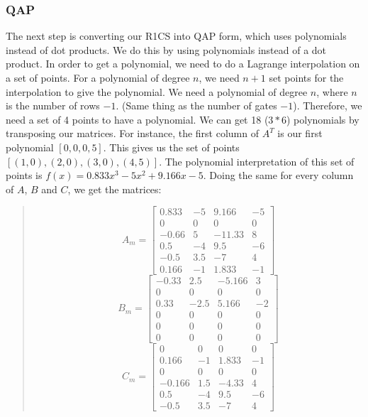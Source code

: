 \subsubsection{QAP}
The next step is converting our R1CS into QAP form, which uses polynomials instead of dot products.
We do this by using polynomials instead of a dot product.
In order to get a polynomial, we need to do a Lagrange interpolation on a set of points.
For a polynomial of degree $n$, we need $n+1$ set points for the interpolation to give the polynomial.
We need a polynomial of degree $n$, where $n$ is the number of rows $- 1$. (Same thing as the number of gates $-1$). 
Therefore, we need a set of 4 points to have a polynomial.
We can get 18 ($3*6$) polynomials by transposing our matrices.
For instance, the first column of $A^T$ is our first polynomial $[0,0,0,5]$.
This gives us the set of points $[(1,0),(2,0),(3,0),(4,5)]$.
The polynomial interpretation of this set of points is $f(x) = 0.833x^3 - 5x^2 + 9.166x -5$.
Doing the same for every column of $A$, $B$ and $C$, we get the matrices:
\begin{quote}
   \[
 A_m =
   \begin{bmatrix}
      0.833 & -5 & 9.166 & -5 \\
      0   & 0   & 0   & 0   \\
      -0.66   & 5 & -11.33   & 8 \\
      0.5 & -4 & 9.5 & -6 \\
      -0.5   & 3.5 & -7 & 4 \\
      0.166 & -1 & 1.833 & -1
   \end{bmatrix}
   \]
   \[
 B_m =
   \begin{bmatrix}
      -0.33   & 2.5 & -5.166 & 3 \\
      0   & 0   & 0   & 0   \\
      0.33 & -2.5 & 5.166 & -2 \\
      0   & 0   & 0   & 0   \\
      0   & 0   & 0   & 0   \\
      0   & 0   & 0   & 0
   \end{bmatrix}
   \]
   \[
 C_m =
   \begin{bmatrix}
      0   & 0   & 0   & 0   \\
      0.166 & -1 & 1.833 & -1 \\
      0   & 0   & 0   & 0   \\
      -0.166   & 1.5 & -4.33 & 4 \\
      0.5 & -4 & 9.5 & -6 \\
      -0.5   & 3.5 & -7 & 4
   \end{bmatrix}
   \]
   \end{quote}
   
